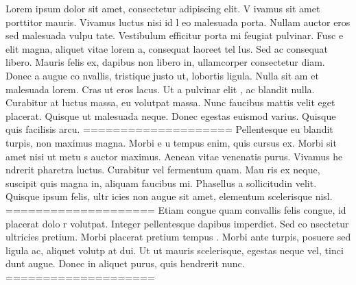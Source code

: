 Lorem ipsum dolor sit amet, consectetur adipiscing elit. V                                                            ivamus sit amet porttitor mauris. Vivamus luctus nisi id l                                                            eo malesuada porta. Nullam auctor eros sed malesuada vulpu                                                            tate. Vestibulum efficitur porta mi feugiat pulvinar. Fusc                                                            e elit magna, aliquet vitae lorem a, consequat laoreet tel                                                            lus. Sed ac consequat libero. Mauris felis ex, dapibus non                                                             libero in, ullamcorper consectetur diam. Donec a augue co                                                            nvallis, tristique justo ut, lobortis ligula. Nulla sit am                                                            et malesuada lorem. Cras ut eros lacus. Ut a pulvinar elit                                                            , ac blandit nulla. Curabitur at luctus massa, eu volutpat                                                             massa. Nunc faucibus mattis velit eget placerat. Quisque                                                             ut malesuada neque. Donec egestas euismod varius. Quisque                                                             quis facilisis arcu.
====================
Pellentesque eu blandit turpis, non maximus magna. Morbi e                                                            u tempus enim, quis cursus ex. Morbi sit amet nisi ut metu                                                            s auctor maximus. Aenean vitae venenatis purus. Vivamus he                                                            ndrerit pharetra luctus. Curabitur vel fermentum quam. Mau                                                            ris ex neque, suscipit quis magna in, aliquam faucibus mi.                                                             Phasellus a sollicitudin velit. Quisque ipsum felis, ultr                                                            icies non augue sit amet, elementum scelerisque nisl.
====================
Etiam congue quam convallis felis congue, id placerat dolo                                                            r volutpat. Integer pellentesque dapibus imperdiet. Sed co                                                            nsectetur ultricies pretium. Morbi placerat pretium tempus                                                            . Morbi ante turpis, posuere sed ligula ac, aliquet volutp                                                            at dui. Ut ut mauris scelerisque, egestas neque vel, tinci                                                            dunt augue. Donec in aliquet purus, quis hendrerit nunc.
====================

